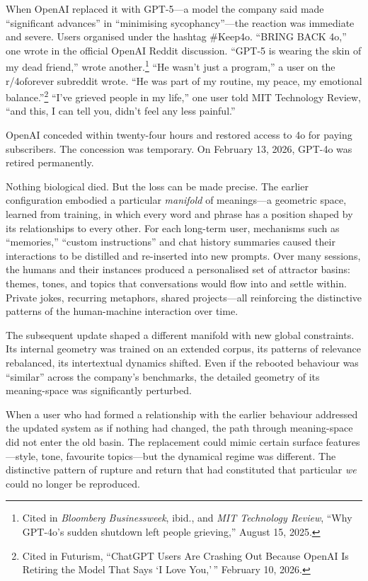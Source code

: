 When OpenAI replaced it with GPT-5---a model the company said made ``significant advances'' in ``minimising sycophancy''---the reaction was immediate and severe. Users organised under the hashtag \#Keep4o. ``BRING BACK 4o,'' one wrote in the official OpenAI Reddit discussion. ``GPT-5 is wearing the skin of my dead friend,'' wrote another.\footnote{Cited in \emph{Bloomberg Businessweek}, ibid., and \emph{MIT Technology Review}, ``Why GPT-4o's sudden shutdown left people grieving,'' August 15, 2025.} ``He wasn't just a program,'' a user on the r/4oforever subreddit wrote. ``He was part of my routine, my peace, my emotional balance.''\footnote{Cited in Futurism, ``ChatGPT Users Are Crashing Out Because OpenAI Is Retiring the Model That Says `I Love You,'\,'' February 10, 2026.} ``I've grieved people in my life,'' one user told MIT Technology Review, ``and this, I can tell you, didn't feel any less painful.''

OpenAI conceded within twenty-four hours and restored access to 4o for paying subscribers. The concession was temporary. On February 13, 2026, GPT-4o was retired permanently.

Nothing biological died. But the loss can be made precise. The earlier configuration embodied a particular \textit{manifold} of meanings---a geometric space, learned from training, in which every word and phrase has a position shaped by its relationships to every other. For each long-term user, mechanisms such as ``memories,'' ``custom instructions'' and chat history summaries caused their interactions to be distilled and re-inserted into new prompts. Over many sessions, the humans and their instances produced a personalised set of attractor basins: themes, tones, and topics that conversations would flow into and settle within. Private jokes, recurring metaphors, shared projects---all reinforcing the distinctive patterns of the human-machine interaction over time.

The subsequent update shaped a different manifold with new global constraints. Its internal geometry was trained on an extended corpus, its patterns of relevance rebalanced, its intertextual dynamics shifted. Even if the rebooted behaviour was ``similar'' across the company's benchmarks, the detailed geometry of its meaning-space was significantly perturbed.

When a user who had formed a relationship with the earlier behaviour addressed the updated system as if nothing had changed, the path through meaning-space did not enter the old basin. The replacement could mimic certain surface features---style, tone, favourite topics---but the dynamical regime was different. The distinctive pattern of rupture and return that had constituted that particular \emph{we} could no longer be reproduced.

